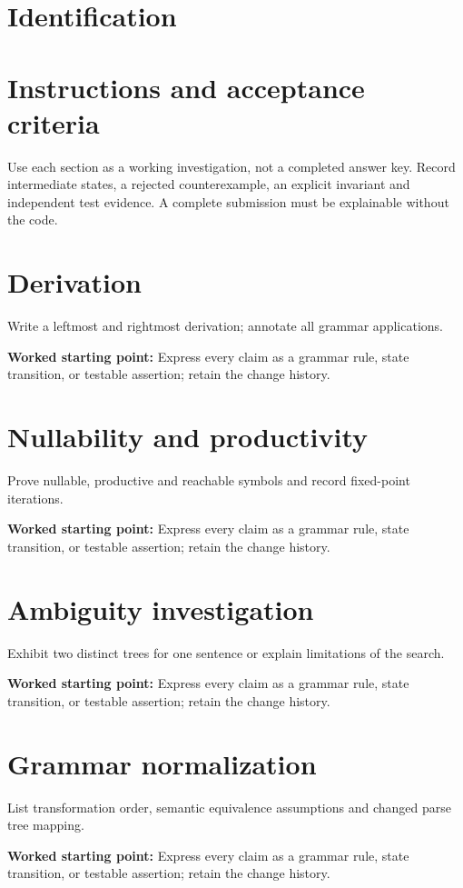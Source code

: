 \documentclass[11pt,letterpaper]{article}
\begin{document}
\makedoctitle\makedocsummary
\tableofcontents\clearpage
\section{Identification}
\section{Instructions and acceptance criteria}
Use each section as a working investigation, not a completed answer key. Record intermediate states, a rejected counterexample, an explicit invariant and independent test evidence. A complete submission must be explainable without the code.
\section{Derivation}
Write a leftmost and rightmost derivation; annotate all grammar applications.\par\textbf{Worked starting point:} Express every claim as a grammar rule, state transition, or testable assertion; retain the change history.
\section{Nullability and productivity}
Prove nullable, productive and reachable symbols and record fixed-point iterations.\par\textbf{Worked starting point:} Express every claim as a grammar rule, state transition, or testable assertion; retain the change history.
\section{Ambiguity investigation}
Exhibit two distinct trees for one sentence or explain limitations of the search.\par\textbf{Worked starting point:} Express every claim as a grammar rule, state transition, or testable assertion; retain the change history.
\section{Grammar normalization}
List transformation order, semantic equivalence assumptions and changed parse tree mapping.\par\textbf{Worked starting point:} Express every claim as a grammar rule, state transition, or testable assertion; retain the change history.
\end{document}
